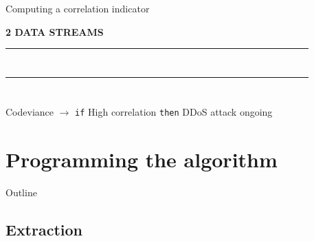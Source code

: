 \documentclass[mathserif]{beamer}
\begin{document}
	\begin{frame}{Computing a correlation indicator}
	
	\begin{center}
		\textbf{2 DATA STREAMS}
	\end{center}
	
	\begin{center}\begin{tabular}{|c|c|c|c|c|c|c|c|c|c|c|c|c|c|c|c|c|c|c|c|}
	\hline
	~ & ~ & \cellcolor{purple}~ & ~ & \cellcolor{purple}~ & ~ & ~ & \cellcolor{purple}~ & ~ & ~ & \cellcolor{purple}~ & ~ & ~ & ~ & ~ & ~ & ~ &\cellcolor{purple}~ & ~ & ~ \\
	\hline
	\end{tabular}\end{center}
	
	\begin{center}\begin{tabular}{|c|c|c|c|c|c|c|c|c|c|c|c|c|c|c|c|c|c|c|c|}
	\hline
	\cellcolor{purple}~ & ~ & ~ & ~ & \cellcolor{purple}~ & ~ & \cellcolor{purple}~ & ~ & ~ & ~ & \cellcolor{purple}~ & ~ & ~ & ~ & \cellcolor{purple}~ & ~ & ~ & ~ & \cellcolor{purple}~ & ~ \\
	\hline
	\end{tabular}\end{center}
	
	\begin{alertblock}{Codeviance $\longrightarrow$ \texttt{if} High correlation \texttt{then} DDoS attack ongoing}
	\end{alertblock}
	
	
	\end{frame}
	

\section{Programming the algorithm}

	\begin{frame}{Outline}
		\tableofcontents[currentsection]
	\end{frame}

	\subsection{Extraction}
	
\end{document}
